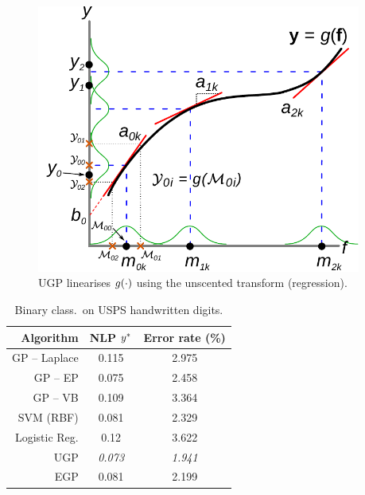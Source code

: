 \documentclass{beamer}
\begin{document}
\begin{frame}
\begin{columns}
\begin{column}{0.45\linewidth}
\end{column}

\begin{column}{0.55\linewidth}

\begin{figure}
    \includegraphics[width=0.65\linewidth]{fig/statlin_gp}

    \caption{UGP linearises $g\!\left({{\cdot}}\right)$ using the unscented transform
        (regression).}

\end{figure}

\vspace{-1.1cm}

\begin{table}[tb]
    \centering
    \caption[]{Binary class.\ on USPS handwritten digits.}
    \tiny
    \vspace{-3mm}
    \begin{tabular}{r| c c}
    Algorithm & NLP $y^{*}$ & Error rate (\%) \\
    \toprule
    GP -- Laplace & 0.115& 2.975 \\
    GP -- EP & 0.075& 2.458 \\
    GP -- VB & 0.109 & 3.364 \\ 
    SVM (RBF) & 0.081 & 2.329 \\
    Logistic Reg. & 0.12 & 3.622 \\
    \midrule
    UGP & \emph{0.073} & \emph{1.941} \\
    EGP & 0.081 & 2.199 \\
    \bottomrule
    \end{tabular}
    \label{tab:class}
\end{table}

\end{column}


\end{columns}

\end{frame}
\end{document}
